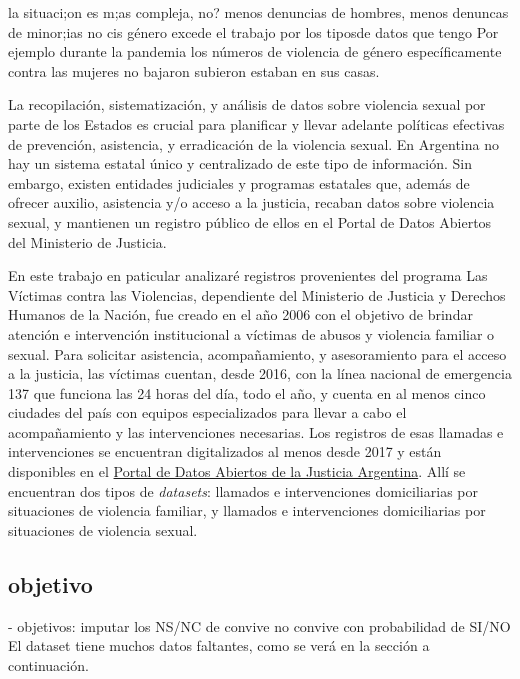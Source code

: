 \documentclass[10 pt]{article}
\begin{document}
la situaci;on es m;as compleja, no? menos denuncias de hombres, menos denuncas de minor;ias no cis género excede el trabajo por los tiposde datos que tengo
Por ejemplo durante la pandemia los números de violencia de género específicamente contra las mujeres no bajaron subieron estaban en sus casas.


La  recopilación, sistematización, y análisis de datos sobre violencia sexual por parte de los Estados es crucial para planificar y llevar adelante políticas efectivas de prevención, asistencia, y erradicación de la violencia sexual. En Argentina no hay un sistema estatal único y centralizado de este tipo de información. Sin embargo, existen entidades judiciales y programas estatales que, además de ofrecer auxilio, asistencia y/o acceso a la justicia, recaban datos sobre violencia sexual, y mantienen un registro público de ellos en el Portal de Datos Abiertos del Ministerio de Justicia. 

En este trabajo en paticular analizaré registros provenientes del programa Las Víctimas contra las Violencias, dependiente del Ministerio de Justicia y Derechos Humanos de la Nación, fue creado en el año 2006 con el objetivo de brindar atención e intervención institucional a víctimas de abusos y violencia familiar o sexual. Para solicitar asistencia, acompañamiento, y asesoramiento para el acceso a la justicia, las víctimas cuentan, desde 2016, con la línea nacional de emergencia 137 que funciona las 24 horas del día, todo el año, y cuenta en al menos cinco ciudades del país con equipos especializados para llevar a cabo el acompañamiento y las intervenciones necesarias. Los registros de esas llamadas e intervenciones se encuentran digitalizados al menos desde 2017 y están disponibles en el \href{http://datos.jus.gob.ar/}{Portal de Datos Abiertos de la Justicia Argentina}. Allí se encuentran dos tipos de \textit{datasets}: llamados e intervenciones domiciliarias por situaciones de violencia familiar, y llamados e intervenciones domiciliarias por situaciones de violencia sexual. 



\subsection*{objetivo}
- objetivos: imputar los NS/NC de convive no convive con probabilidad de SI/NO 
El dataset tiene muchos datos faltantes, como se verá en la sección  a continuación.
\end{document}
